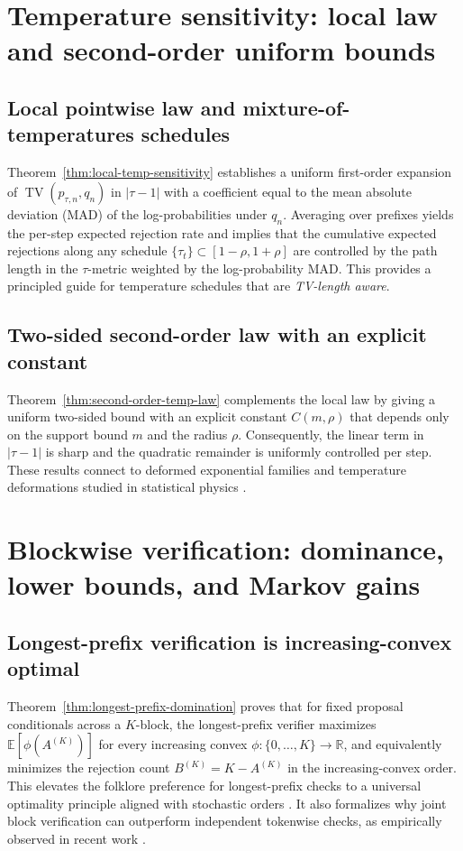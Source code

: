 \documentclass[twoside]{article}
\theoremstyle{plain}
\theoremstyle{definition}
\theoremstyle{remark}
\newcommand{\TV}{\operatorname{TV}}
\newcommand{\E}{\mathbb{E}}
\begin{document}
\section{Temperature sensitivity: local law and second-order uniform bounds}
\label{sec:temperature}
\subsection{Local pointwise law and mixture-of-temperatures schedules}

Theorem~\ref{thm:local-temp-sensitivity} establishes a uniform first-order expansion of $\TV(p_{\tau,n},q_n)$ in $|\tau-1|$ with a coefficient equal to the mean absolute deviation (MAD) of the log-probabilities under $q_n$. Averaging over prefixes yields the per-step expected rejection rate and implies that the cumulative expected rejections along any schedule $\{\tau_t\}\subset[1-\rho,1+\rho]$ are controlled by the path length in the $\tau$-metric weighted by the log-probability MAD. This provides a principled guide for temperature schedules that are \emph{TV-length aware}.

\subsection{Two-sided second-order law with an explicit constant}

Theorem~\ref{thm:second-order-temp-law} complements the local law by giving a uniform two-sided bound with an explicit constant $C(m,\rho)$ that depends only on the support bound $m$ and the radius $\rho$. Consequently, the linear term in $|\tau-1|$ is sharp and the quadratic remainder is uniformly controlled per step. These results connect to deformed exponential families and temperature deformations studied in statistical physics \cite{Naudts2009QExponentialFamily}.

\section{Blockwise verification: dominance, lower bounds, and Markov gains}
\label{sec:block}
\subsection{Longest-prefix verification is increasing-convex optimal}

Theorem~\ref{thm:longest-prefix-domination} proves that for fixed proposal conditionals across a $K$-block, the longest-prefix verifier maximizes $\E[\phi(A^{(K)})]$ for every increasing convex $\phi:\{0,\dots,K\}\to\mathbb{R}$, and equivalently minimizes the rejection count $B^{(K)}=K-A^{(K)}$ in the increasing-convex order. This elevates the folklore preference for longest-prefix checks to a universal optimality principle aligned with stochastic orders \cite{ShakedShanthikumar2007StochasticOrders}. It also formalizes why joint block verification can outperform independent tokenwise checks, as empirically observed in recent work \cite{Sun2024BlockVerification}.
\end{document}

